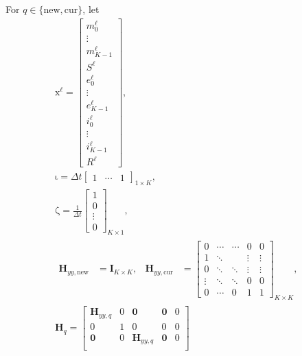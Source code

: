 \documentclass[USenglish]{article}
\renewcommand{\vec}[1]{\boldsymbol{\mathrm{#1}}}
\newcommand{\mat}[1]{\mathbf{#1}}
\begin{document}
For $q \in \{\mathrm{new}, \mathrm{cur}\}$, let
\begin{subequations}
  \begin{gather}
    \vec{x}^{\ell} =
    \begin{bmatrix}
      m_0^{\ell} \\ \vdots \\ m_{K - 1}^{\ell} \\
      S^{\ell} \\
      e_0^{\ell} \\ \vdots \\ e_{K - 1}^{\ell} \\
      i_0^{\ell} \\ \vdots \\ i_{K - 1}^{\ell} \\
      R^{\ell}
    \end{bmatrix},
    \\
    \vec{\iota} =
    \Delta t
    \begin{bmatrix}
      1 & \cdots & 1
    \end{bmatrix}_{1 \times K},
    \\
    \vec{\zeta} =
    \frac{1}{\Delta t}
    \begin{bmatrix}
      1 \\ 0 \\ \vdots \\ 0
    \end{bmatrix}_{K \times 1},
    \\
    \begin{aligned}
      \mat{H}_{yy, \mathrm{new}} &= \mat{I}_{K \times K},
      &
      \mat{H}_{yy, \mathrm{cur}} &=
      \begin{bmatrix}
        0 & \cdots & \cdots & 0 & 0 \\
        1 & \ddots & & \vdots & \vdots \\
        0 & \ddots & \ddots & \vdots & \vdots \\
        \vdots & \ddots & \ddots & 0 & 0 \\
        0 & \cdots & 0 & 1 & 1
      \end{bmatrix}_{K \times K},
    \end{aligned}
    \\
    \mat{H}_{q} =
    \begin{bmatrix}
      \mat{H}_{yy, q} & \vec{0} & \mat{0} & \mat{0} & \vec{0} \\
      \vec{0} & 1 & \vec{0} & \vec{0} & 0 \\
      \mat{0} & \vec{0} & \mat{H}_{yy, q} & \mat{0} & \vec{0} \\

\end{bmatrix}
\end{gather}
\end{subequations}
\end{document}
